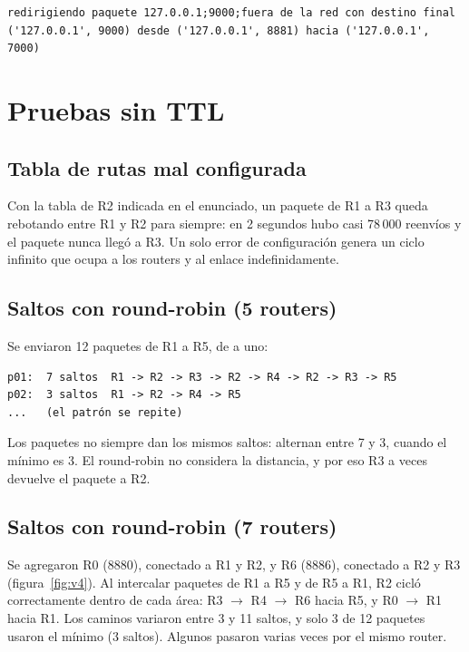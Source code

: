 \documentclass[11pt,letterpaper]{article}
\begin{document}
\begin{lstlisting}
redirigiendo paquete 127.0.0.1;9000;fuera de la red con destino final ('127.0.0.1', 9000) desde ('127.0.0.1', 8881) hacia ('127.0.0.1', 7000)
\end{lstlisting}

\section{Pruebas sin TTL}

\subsection{Tabla de rutas mal configurada}

Con la tabla de R2 indicada en el enunciado, un paquete de R1 a R3 queda rebotando entre
R1 y R2 para siempre: en 2 segundos hubo casi 78\,000 reenvíos y el paquete nunca llegó a
R3. Un solo error de configuración genera un ciclo infinito que ocupa a los routers y al
enlace indefinidamente.

\subsection{Saltos con round-robin (5 routers)}

Se enviaron 12 paquetes de R1 a R5, de a uno:

\begin{lstlisting}
p01:  7 saltos  R1 -> R2 -> R3 -> R2 -> R4 -> R2 -> R3 -> R5
p02:  3 saltos  R1 -> R2 -> R4 -> R5
...   (el patrón se repite)
\end{lstlisting}

Los paquetes no siempre dan los mismos saltos: alternan entre 7 y 3, cuando el mínimo es 3.
El round-robin no considera la distancia, y por eso R3 a veces devuelve el paquete a R2.

\subsection{Saltos con round-robin (7 routers)}

Se agregaron R0 (8880), conectado a R1 y R2, y R6 (8886), conectado a R2 y R3
(figura~\ref{fig:v4}). Al intercalar paquetes de R1 a R5 y de R5 a R1, R2 cicló
correctamente dentro de cada área: R3 $\rightarrow$ R4 $\rightarrow$ R6 hacia R5, y
R0 $\rightarrow$ R1 hacia R1. Los caminos variaron entre 3 y 11 saltos, y solo 3 de 12
paquetes usaron el mínimo (3 saltos). Algunos pasaron varias veces por el mismo router.
\end{document}
